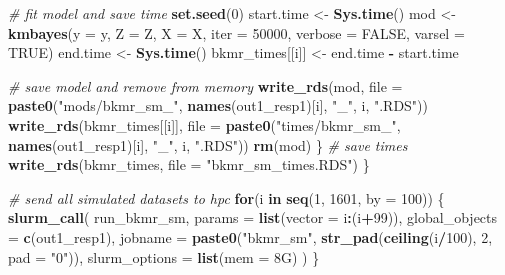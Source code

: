 \documentclass[12pt, twoside]{amherstthesis}
\newenvironment{Shaded}{\begin{snugshade}}{\end{snugshade}}
\newcommand{\AttributeTok}[1]{\textcolor[rgb]{0.13,0.29,0.53}{#1}}
\newcommand{\CommentTok}[1]{\textcolor[rgb]{0.56,0.35,0.01}{\textit{#1}}}
\newcommand{\ConstantTok}[1]{\textcolor[rgb]{0.56,0.35,0.01}{#1}}
\newcommand{\ControlFlowTok}[1]{\textcolor[rgb]{0.13,0.29,0.53}{\textbf{#1}}}
\newcommand{\DecValTok}[1]{\textcolor[rgb]{0.00,0.00,0.81}{#1}}
\newcommand{\FunctionTok}[1]{\textcolor[rgb]{0.13,0.29,0.53}{\textbf{#1}}}
\newcommand{\NormalTok}[1]{#1}
\newcommand{\OtherTok}[1]{\textcolor[rgb]{0.56,0.35,0.01}{#1}}
\newcommand{\SpecialCharTok}[1]{\textcolor[rgb]{0.81,0.36,0.00}{\textbf{#1}}}
\newcommand{\StringTok}[1]{\textcolor[rgb]{0.31,0.60,0.02}{#1}}
\begin{document}
\begin{Shaded}
\begin{Highlighting}[]
    \CommentTok{\# fit model and save time}
    \FunctionTok{set.seed}\NormalTok{(}\DecValTok{0}\NormalTok{)}
\NormalTok{    start.time }\OtherTok{\textless{}{-}} \FunctionTok{Sys.time}\NormalTok{()}
\NormalTok{    mod }\OtherTok{\textless{}{-}} \FunctionTok{kmbayes}\NormalTok{(}\AttributeTok{y =}\NormalTok{ y, }\AttributeTok{Z =}\NormalTok{ Z, }\AttributeTok{X =}\NormalTok{ X, }
                          \AttributeTok{iter =} \DecValTok{50000}\NormalTok{, }\AttributeTok{verbose =} \ConstantTok{FALSE}\NormalTok{, }\AttributeTok{varsel =} \ConstantTok{TRUE}\NormalTok{)}
\NormalTok{    end.time }\OtherTok{\textless{}{-}} \FunctionTok{Sys.time}\NormalTok{()}
\NormalTok{    bkmr\_times[[i]] }\OtherTok{\textless{}{-}}\NormalTok{ end.time }\SpecialCharTok{{-}}\NormalTok{ start.time}
    
    \CommentTok{\# save model and remove from memory}
    \FunctionTok{write\_rds}\NormalTok{(mod, }\AttributeTok{file =} \FunctionTok{paste0}\NormalTok{(}\StringTok{"mods/bkmr\_sm\_"}\NormalTok{, }\FunctionTok{names}\NormalTok{(out1\_resp1)[i], }\StringTok{"\_"}\NormalTok{, i, }\StringTok{".RDS"}\NormalTok{))}
    \FunctionTok{write\_rds}\NormalTok{(bkmr\_times[[i]], }\AttributeTok{file =} 
                \FunctionTok{paste0}\NormalTok{(}\StringTok{"times/bkmr\_sm\_"}\NormalTok{, }\FunctionTok{names}\NormalTok{(out1\_resp1)[i], }\StringTok{"\_"}\NormalTok{, i, }\StringTok{".RDS"}\NormalTok{))}
    \FunctionTok{rm}\NormalTok{(mod)}
\NormalTok{  \}}
  \CommentTok{\# save times}
  \FunctionTok{write\_rds}\NormalTok{(bkmr\_times, }\AttributeTok{file =} \StringTok{"bkmr\_sm\_times.RDS"}\NormalTok{)}
\NormalTok{\}}

\CommentTok{\# send all simulated datasets to hpc}
\ControlFlowTok{for}\NormalTok{(i }\ControlFlowTok{in} \FunctionTok{seq}\NormalTok{(}\DecValTok{1}\NormalTok{, }\DecValTok{1601}\NormalTok{, }\AttributeTok{by =} \DecValTok{100}\NormalTok{)) \{}
  \FunctionTok{slurm\_call}\NormalTok{(}
\NormalTok{    run\_bkmr\_sm,}
    \AttributeTok{params =} \FunctionTok{list}\NormalTok{(}\AttributeTok{vector =}\NormalTok{ i}\SpecialCharTok{:}\NormalTok{(i}\SpecialCharTok{+}\DecValTok{99}\NormalTok{)),}
    \AttributeTok{global\_objects =} \FunctionTok{c}\NormalTok{(}\StringTok{\textquotesingle{}out1\_resp1\textquotesingle{}}\NormalTok{),}
    \AttributeTok{jobname =} \FunctionTok{paste0}\NormalTok{(}\StringTok{"bkmr\_sm"}\NormalTok{, }\FunctionTok{str\_pad}\NormalTok{(}\FunctionTok{ceiling}\NormalTok{(i}\SpecialCharTok{/}\DecValTok{100}\NormalTok{), }\DecValTok{2}\NormalTok{, }\AttributeTok{pad =} \StringTok{"0"}\NormalTok{)),}
    \AttributeTok{slurm\_options =} \FunctionTok{list}\NormalTok{(}\AttributeTok{mem =} \StringTok{\textquotesingle{}8G\textquotesingle{}}\NormalTok{)}
\NormalTok{  )}
\NormalTok{\}}
\end{Highlighting}
\end{Shaded}
\normalsize
\end{document}

